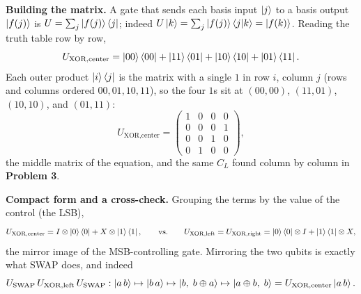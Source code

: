 \documentclass[a4paper, 10pt]{article}
\begin{document}
\begin{solution}
	\noindent \textbf{Building the matrix.} A gate that sends each basis input \( \ket{j} \) to a basis output \( \ket{f(j)} \) is \( U = \sum_j \ket{f(j)}\bra{j} \); indeed \( U\ket{k} = \sum_j \ket{f(j)}\braket{j \vert k} = \ket{f(k)} \).
	Reading the truth table row by row,
	\[
		U_{\text{XOR},\text{center}}
		= \ket{00}\bra{00} + \ket{11}\bra{01} + \ket{10}\bra{10} + \ket{01}\bra{11}.
	\]
	Each outer product \( \ket{i}\bra{j} \) is the matrix with a single \( 1 \) in row \( i \), column \( j \) (rows and columns ordered \( 00, 01, 10, 11 \)), so the four \( 1 \)s sit at \( (00, 00) \), \( (11, 01) \), \( (10, 10) \), and \( (01, 11) \):
	\[
		U_{\text{XOR},\text{center}}
		= \begin{pmatrix}
			1 & 0 & 0 & 0 \\
			0 & 0 & 0 & 1 \\
			0 & 0 & 1 & 0 \\
			0 & 1 & 0 & 0
		\end{pmatrix},
	\]
	the middle matrix of the equation, and the same \( C_L \) found column by column in \textbf{Problem 3}.

	\noindent \textbf{Compact form and a cross-check.} Grouping the terms by the value of the control (the LSB),
	\[
		U_{\text{XOR},\text{center}} = I \otimes \ket{0}\bra{0} + X \otimes \ket{1}\bra{1},
		\qquad\text{vs.}\qquad
		U_{\text{XOR},\text{left}} = U_{\text{XOR},\text{right}} = \ket{0}\bra{0} \otimes I + \ket{1}\bra{1} \otimes X,
	\]
	the mirror image of the MSB-controlling gate. Mirroring the two qubits is exactly what SWAP does, and indeed
	\[
		U_{\text{SWAP}}\, U_{\text{XOR},\text{left}}\, U_{\text{SWAP}} :
		\ket{a\,b} \mapsto \ket{b\,a} \mapsto \ket{b,\; b \oplus a} \mapsto \ket{a \oplus b,\; b}
		= U_{\text{XOR},\text{center}}\ket{a\,b}.
	\]


\end{solution}
\end{document}
